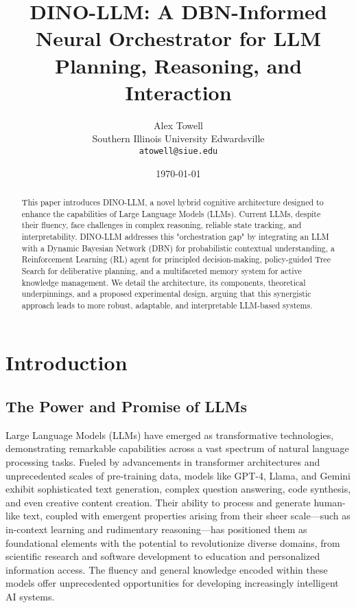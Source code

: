 \documentclass[11pt]{article}
\author{
  Alex Towell \\
  Southern Illinois University Edwardsville \\
  \texttt{atowell@siue.edu}
}
\title{DINO-LLM: A DBN-Informed Neural Orchestrator for LLM Planning, Reasoning, and Interaction}
\date{\today}
\begin{document}
\maketitle

\begin{abstract}
This paper introduces DINO-LLM, a novel hybrid cognitive architecture designed to enhance the capabilities of Large Language Models (LLMs). Current LLMs, despite their fluency, face challenges in complex reasoning, reliable state tracking, and interpretability. DINO-LLM addresses this "orchestration gap" by integrating an LLM with a Dynamic Bayesian Network (DBN) for probabilistic contextual understanding, a Reinforcement Learning (RL) agent for principled decision-making, policy-guided Tree Search for deliberative planning, and a multifaceted memory system for active knowledge management. We detail the architecture, its components, theoretical underpinnings, and a proposed experimental design, arguing that this synergistic approach leads to more robust, adaptable, and interpretable LLM-based systems.
\end{abstract}

\section{Introduction}
\label{sec:introduction}

\subsection{The Power and Promise of LLMs}
\label{sec:intro_llm_power}
Large Language Models (LLMs) have emerged as transformative technologies, demonstrating remarkable capabilities across a vast spectrum of natural language processing tasks. Fueled by advancements in transformer architectures and unprecedented scales of pre-training data, models like GPT-4, Llama, and Gemini exhibit sophisticated text generation, complex question answering, code synthesis, and even creative content creation. Their ability to process and generate human-like text, coupled with emergent properties arising from their sheer scale—such as in-context learning and rudimentary reasoning—has positioned them as foundational elements with the potential to revolutionize diverse domains, from scientific research and software development to education and personalized information access. The fluency and general knowledge encoded within these models offer unprecedented opportunities for developing increasingly intelligent AI systems.
\end{document}
